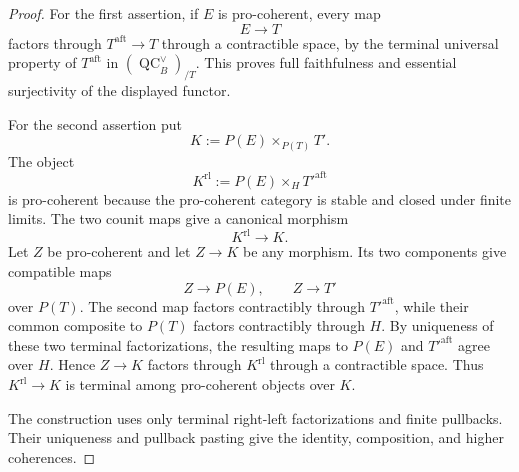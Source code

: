 \begin{proof}
For the first assertion, if $E$ is pro-coherent, every map
\[
    E\longrightarrow T
\]
factors through $T^{\mathrm{aft}}\to T$ through a contractible space, by the
terminal universal property of $T^{\mathrm{aft}}$ in
$(\operatorname{QC}^{\vee}_B)_{/T}$.  This proves full faithfulness and
essential surjectivity of the displayed functor.

For the second assertion put
\[
    K:=P(E)\times_{P(T)}T'.
\]
The object
\[
    K^{\mathrm{rl}}
    :=
    P(E)\times_H T'^{\mathrm{aft}}
\]
is pro-coherent because the pro-coherent category is stable and closed under
finite limits.  The two counit maps give a canonical morphism
\[
    K^{\mathrm{rl}}\longrightarrow K.
\]
Let $Z$ be pro-coherent and let $Z\to K$ be any morphism.  Its two components
give compatible maps
\[
    Z\longrightarrow P(E),
    \qquad
    Z\longrightarrow T'
\]
over $P(T)$.  The second map factors contractibly through
$T'^{\mathrm{aft}}$, while their common composite to $P(T)$ factors
contractibly through $H$.  By uniqueness of these two terminal
factorizations, the resulting maps to $P(E)$ and $T'^{\mathrm{aft}}$ agree
over $H$.  Hence $Z\to K$ factors through $K^{\mathrm{rl}}$ through a
contractible space.  Thus $K^{\mathrm{rl}}\to K$ is terminal among
pro-coherent objects over $K$.

The construction uses only terminal right-left factorizations and finite
pullbacks.  Their uniqueness and pullback pasting give the identity,
composition, and higher coherences.
\end{proof}


